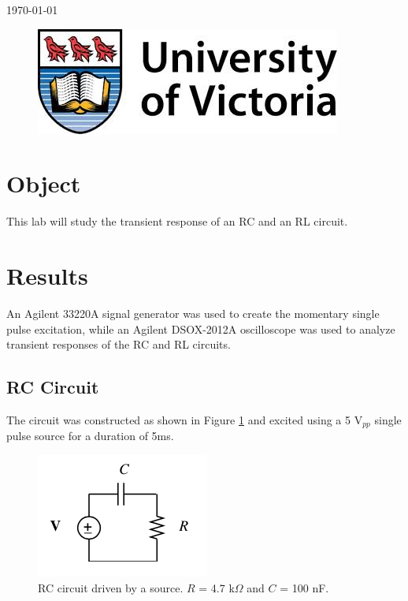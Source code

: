\documentclass[12pt]{article}
\begin{document}
\begin{titlepage}
{\large \today}\\ %

\begin{figure}[b]	 %
	\centering
	\includegraphics[scale=0.3]{UVic_logo}
\end{figure}

\end{titlepage}





\section{Object}\label{sec:object}
This lab will study the transient response of an RC and an RL circuit.

\section{Results}\label{sec:results}
An Agilent 33220A signal generator was used to create the momentary single pulse excitation, while an Agilent DSOX-2012A oscilloscope was used to analyze transient responses of the RC and RL circuits. 


\subsection{RC Circuit}\label{sec:rc}
The circuit was constructed as shown in Figure \ref{fig:rc_circuit} and excited using a 5 V$_{pp}$ single pulse source for a duration of 5ms. 
\begin{figure}[h]
	\centering
	\includegraphics[scale = 0.75]{rc_circuit}
	\caption{RC circuit driven by a source. $R$ = 4.7 k$\Omega$ and $C$ = 100 nF. }
	\label{fig:rc_circuit}
\end{figure}
\end{document}
